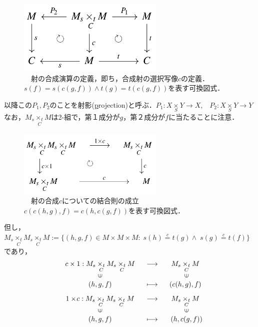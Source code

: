 \documentclass[uplatex, 12pt, a4paper, dvipdfmx]{jsarticle}
\begin{document}
\begin{figure}[ht] \begin{center}  \caption{\label{def-cd:1}　射の合成演算の定義，即ち，合成射の選択写像$c$の定義．$s(f)=s(c(g,f))\wedge t(g)=t(c(g,f))$を表す可換図式．}
    \includegraphics[width=7cm]{cd-1.png}
\end{center}\end{figure}
以降この$P_1, P_2$のことを射影(\underline{p}rojection)と呼ぶ．\hspace{6mm}$P_1: X\underset{S}{\times}Y \longrightarrow X, \; \; \; P_2: X\underset{S}{\times}Y \longrightarrow Y$\\
なお，$M_s\underset{C}{\times_t}M$は2-組で，第１成分が$g$，第２成分が$f$に当たることに注意．

\begin{figure}[ht] \begin{center}  \caption{\label{def-cd:2}　射の合成$c$についての結合則の成立$c(c(h,g),f)=c(h,c(g,f))$を表す可換図式．}
    \includegraphics[width=7cm]{cd-2.png}
\end{center}\end{figure}
但し，$M_s \underset{C}{\times_t}M_s \underset{C}{\times_t}M := \{ (h,g,f)\in M\times M\times M : \; s(h)\overset{c}{=} t(g) \wedge \; s(g) \overset{c}{=} t(f) \}$であり，$$\begin{array}{ccc}
        c\times1:M_s\underset{C}{\times_t}M_s\underset{C}{\times_t}M & \longrightarrow & M_s\underset{C}{\times_t}M \\
        \rotatebox{90}{$\in$} & & \rotatebox{90}{$\in$}\\
        (h,g,f) & \longmapsto & (c(h,g),f) \\[3mm]
        1\times \! c:M_s\underset{C}{\times_t}M_s\underset{C}{\times_t}M & \longrightarrow & M_s\underset{C}{\times_t}M \\
        \rotatebox{90}{$\in$} & & \rotatebox{90}{$\in$}\\
        (h,g,f) & \longmapsto & (h,c(g,f))
\end{array}$$
\end{document}

